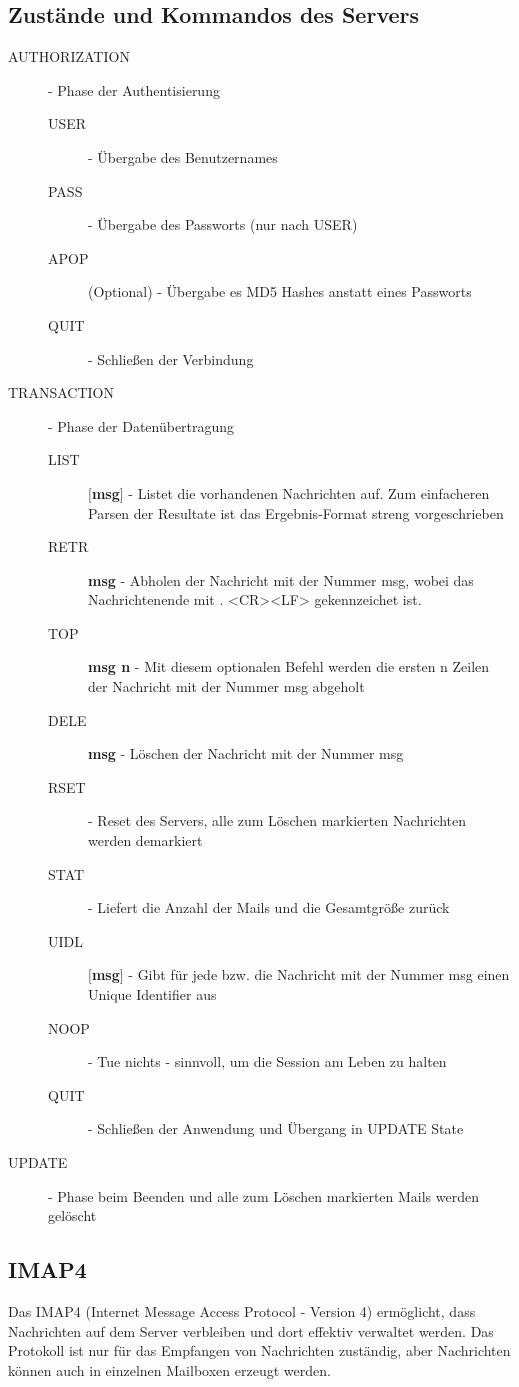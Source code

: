 \documentclass{article} %
\begin{document}
\subsection{Zustände und Kommandos des Servers}
	\begin{description}
	\item[AUTHORIZATION] - Phase der Authentisierung 
		\begin{description}
		\item[USER] - Übergabe des Benutzernames 
		\item[PASS] - Übergabe des Passworts (nur nach USER) 
		\item[APOP](Optional) - Übergabe es MD5 Hashes anstatt eines Passworts
		\item[QUIT] - Schließen der Verbindung 
		\end{description}
	\item[TRANSACTION] - Phase der Datenübertragung 
			\begin{description}
			\item[LIST]\textbf{$[$msg$]$} - Listet die vorhandenen Nachrichten auf. Zum einfacheren Parsen der Resultate ist das Ergebnis-Format streng vorgeschrieben
			\item[RETR]\textbf{msg} - Abholen der Nachricht mit der Nummer msg, wobei das Nachrichtenende mit . <CR><LF> gekennzeichet ist.
			\item[TOP]\textbf{msg n} - Mit diesem optionalen Befehl werden die ersten n Zeilen der Nachricht mit der Nummer msg abgeholt
			\item[DELE]\textbf{msg} - Löschen der Nachricht mit der Nummer msg 
			\item[RSET] - Reset des Servers, alle zum Löschen markierten Nachrichten werden demarkiert 
			\item[STAT] - Liefert die Anzahl der Mails und die Gesamtgröße zurück 
			\item[UIDL]\textbf{$[$msg$]$} - Gibt für jede bzw. die Nachricht mit der Nummer msg einen Unique Identifier aus 
			\item[NOOP] - Tue nichts - sinnvoll, um die Session am Leben zu halten 
			\item[QUIT] - Schließen der Anwendung und Übergang in UPDATE State 
			\end{description}
	\item[UPDATE] - Phase beim Beenden und alle zum Löschen markierten Mails werden gelöscht 
	\end{description}
\subsection{IMAP4}
Das IMAP4 (Internet Message Access Protocol  - Version 4) ermöglicht, dass Nachrichten auf dem Server verbleiben und dort effektiv verwaltet werden. Das Protokoll ist nur für das Empfangen von Nachrichten zuständig, aber Nachrichten können auch in einzelnen Mailboxen erzeugt werden.
\end{document}
